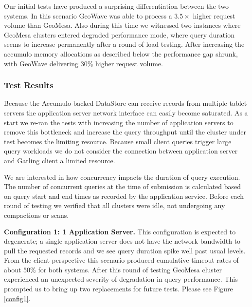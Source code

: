 Our initial tests have produced a surprising differentiation between the two systems.
In this scenario GeoWave was able to process a $3.5 \times$ higher request volume than GeoMesa.
Also during this time we witnessed two instances where GeoMesa clusters entered degraded performance mode,
where query duration seems to increase permanently after a round of load testing.
After increasing the accumulo memory allocations as described below the performance gap shrunk, with GeoWave delivering $30$\% higher request volume.

\subsubsection{Test Results}

Because the Accumulo-backed DataStore can receive records from multiple tablet servers the application server network interface can easily become saturated.
As a start we re-ran the tests with increasing the number of application servers to remove this bottleneck and increase the query throughput until the cluster under test becomes the limiting resource.
Because small client queries trigger large query workloads we do not consider the connection between application server and Gatling client a limited resource.

We are interested in how concurrency impacts the duration of query execution.
The number of concurrent queries at the time of submission is calculated based on query start and end times as recorded by the application service.
Before each round of testing we verified that all clusters were idle, not undergoing any compactions or scans.

{\bf Configuration 1: 1 Application Server.}
This configuration is expected to degenerate; a single application server does not have the network bandwidth to pull the requested records and we see query duration spike well past usual levels.
From the client perspective this scenario produced cumulative timeout rates of about $50$\% for both systems.
After this round of testing GeoMesa cluster experienced an unexpected severity of degradation in query performance.
This prompted us to bring up two replacements for future tests.
Please see Figure \ref{config1}.

